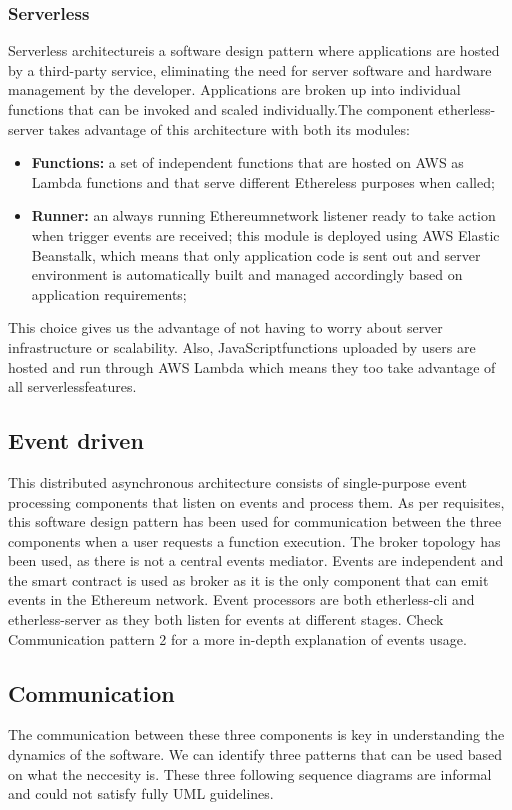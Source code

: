 \subsubsection{Serverless}
Serverless architecture\glo is a software design pattern where applications are hosted by a third-party service, eliminating the need for server software and hardware management by the developer. Applications are broken up into individual functions that can be invoked and scaled individually.\newline\newline The component etherless-server takes advantage of this architecture with both its modules:
\begin{itemize}
	\item \textbf{Functions:} a set of independent functions that are hosted on AWS as Lambda functions and that serve different Ethereless purposes when called;
	\item \textbf{Runner:} an always running Ethereum\glo network listener ready to take action when trigger events are received; this module is deployed using AWS Elastic Beanstalk, which means that only application code is sent out and server environment is automatically built and managed accordingly based on application requirements;
\end{itemize}
This choice gives us the advantage of not having to worry about server infrastructure or scalability.
Also, JavaScript\glo functions uploaded by users are hosted and run through AWS Lambda which means they too take advantage of all serverless\glo features.
\subsection{Event driven}
This distributed asynchronous architecture consists of single-purpose event processing components that listen on events and process them.\newline
As per requisites, this software design pattern has been used for communication between the three components when a user requests a function execution. The broker topology has been used, as there is not a central events mediator. Events are independent and the smart contract is used as broker as it is the only component that can emit events in the Ethereum network. Event processors are both etherless-cli and etherless-server as they both listen for events at different stages. Check Communication pattern 2 for a more in-depth explanation of events usage.
\newpage
\subsection{Communication}
The communication between these three components is key in understanding the dynamics of the software. We can identify three patterns that can be used based on what the neccesity is.
These three following sequence diagrams are informal and could not satisfy fully UML guidelines.
